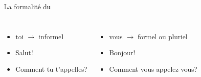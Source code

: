 \begin{frame}{La formalité du }
  \begin{columns}
      \begin{itemize}
        \item[] toi $\to$ informel
        \item Salut!
        \item Comment tu t'appelles?
      \end{itemize}
      \begin{itemize}
        \item[] vous $\to$ formel ou pluriel
        \item Bonjour!
        \item Comment vous appelez-vous?
      \end{itemize}
  \end{columns}
\end{frame}